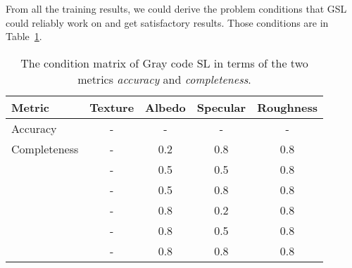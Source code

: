 From all the training results, we could derive the problem conditions that GSL could reliably work on and get satisfactory results. Those conditions are in Table~\ref{tab:sl_training_result}.
\begin{table}[!htbp]
  \centering
  \begin{tabular}{l*{4}{c}}
  \hline
  \textbf{Metric} & Texture & Albedo & Specular & Roughness\\
  \hline
  Accuracy     & - & - & - & -\\
  \hline
  Completeness & - & 0.2 & 0.8 & 0.8\\
               & - & 0.5 & 0.5 & 0.8\\
               & - & 0.5 & 0.8 & 0.8\\
               & - & 0.8 & 0.2 & 0.8\\
               & - & 0.8 & 0.5 & 0.8\\
               & - & 0.8 & 0.8 & 0.8\\
  \hline
  \end{tabular}
  \caption{The condition matrix of Gray code SL in terms of the two metrics \textit{accuracy} and \textit{completeness}.}
  \label{tab:sl_training_result}
\end{table}

